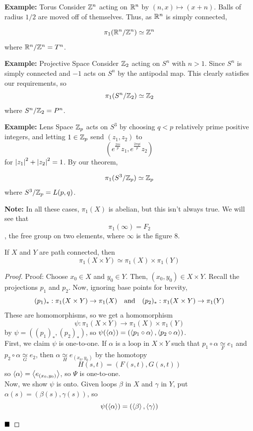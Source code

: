 \begin{example}{\textbf{Example:} Torus}
    Consider $\mathbb{Z}^n$ acting on $\mathbb{R}^n$ by $(n, x) \mapsto (x + n)$. Balls of radius $1/2$ are moved off of themselves. Thus, as $\mathbb{R}^n$ is simply connected,

    \[ \pi_1(\mathbb{R}^n / \mathbb{Z}^n) \simeq \mathbb{Z}^n \]
    where $\mathbb{R}^n / \mathbb{Z}^n = T^n$.
\end{example}

\begin{example}{\textbf{Example:} Projective Space}
    Consider $\mathbb{Z}_2$ acting on $S^n$ with $n > 1$. Since $S^n$ is simply connected and $-1$ acts on $S^n$ by the antipodal map. This clearly satisfies our requirements, so
    \[ \pi_1(S^n / \mathbb{Z}_2) \simeq \mathbb{Z}_2 \]
    where $S^n / \mathbb{Z}_2 = P^n$.
\end{example}

\begin{example}{\textbf{Example:} Lens Space}
    $\mathbb{Z}_p$ acts on $S^3$ by choosing $q < p$ relatively prime positive integers, and letting $1 \in \mathbb{Z}_p$ send $(z_1, z_2)$ to
    \[ \left(e^{\frac{2\pi i}{p}}z_1, e^{\frac{2\pi qi}{p}}z_2\right) \]
    for $\left\lvert {z_1} \right\rvert^2 + \left\lvert {z_2} \right\rvert^2 = 1$. By our theorem,

    \[ \pi_1(S^3 / \mathbb{Z}_{p}) \simeq \mathbb{Z}_p \]
    where $S^3 / \mathbb{Z}_p = L(p, q)$.
\end{example}

\textbf{Note:} In all these cases, $\pi_1(X)$ is abelian, but this isn't always true. We will see that
\[ \pi_1(\infty) = F_2 \]
, the free group on two elements, where $\infty$ is the figure 8.

\begin{theorem}
    If $X$ and $Y$ are path connected, then
    \[ \pi_1(X \times Y) \simeq \pi_1(X) \times \pi_1(Y) \]
\end{theorem}
\begin{proof}{Proof:}
    Choose $x_0 \in X$ and $y_0 \in Y$. Then, $(x_0, y_0) \in X \times Y$. Recall the projections $p_1$ and $p_2$. Now, ignoring base points for brevity,
    \[ (p_1)_{*} : \pi_1(X \times Y) \to \pi_1(X) \quad \text{and} \quad (p_2)_{*} : \pi_1(X \times Y) \to \pi_1(Y) \]
    These are homomorphisms, so we get a homomorphism
    \[ \psi : \pi_1(X \times Y) \to \pi_1(X) \times \pi_1(Y) \]
    by $\psi = ((p_1)_{*}, (p_2)_{*})$, so $\psi(\left\langle {\alpha} \right\rangle) = (\left\langle {p_1 \circ \alpha} \right\rangle, \left\langle {p_2 \circ \alpha} \right\rangle)$.\\

    First, we claim $\psi$ is one-to-one. If $\alpha$ is a loop in $X \times Y$ such that $p_1 \circ \alpha \underset{F}{\simeq} e_1$ and $p_2 \circ \alpha \underset{G}{\simeq} e_2$, then $\alpha \underset{H}{\simeq} e_{(x_0, y_0)}$ by the homotopy
    \[ H(s, t) = (F(s, t), G(s, t)) \]
    so $\left\langle {\alpha} \right\rangle = \left\langle {e_{(x_0, y_0)}} \right\rangle$, so $\Psi$ is one-to-one.\\

    Now, we show $\psi$ is onto. Given loops $\beta$ in $X$ and $\gamma$ in $Y$, put $\alpha(s) = (\beta(s), \gamma(s))$, so
    \[ \psi(\left\langle {\alpha} \right\rangle) = (\left\langle {\beta} \right\rangle, \left\langle {\gamma} \right\rangle) \]


    $\qed$
\end{proof}

